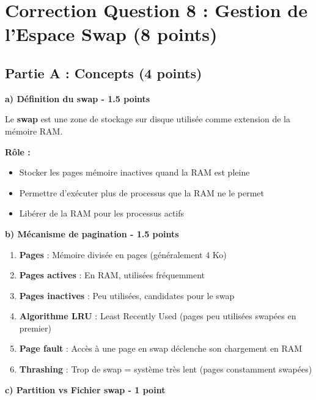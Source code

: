 \documentclass[12pt,a4paper]{article}
\begin{document}
\newpage


\section{Correction Question 8 : Gestion de l'Espace Swap (8 points)}

\subsection*{Partie A : Concepts (4 points)}

\begin{answerbox}
\textbf{a) Définition du swap - 1.5 points}

Le \textbf{swap} est une zone de stockage sur disque utilisée comme extension de la mémoire RAM.

\textbf{Rôle :}
\begin{itemize}
    \item Stocker les pages mémoire inactives quand la RAM est pleine
    \item Permettre d'exécuter plus de processus que la RAM ne le permet
    \item Libérer de la RAM pour les processus actifs
\end{itemize}

\textbf{b) Mécanisme de pagination - 1.5 points}

\begin{enumerate}
    \item \textbf{Pages} : Mémoire divisée en pages (généralement 4 Ko)
    \item \textbf{Pages actives} : En RAM, utilisées fréquemment
    \item \textbf{Pages inactives} : Peu utilisées, candidates pour le swap
    \item \textbf{Algorithme LRU} : Least Recently Used (pages peu utilisées swapées en premier)
    \item \textbf{Page fault} : Accès à une page en swap déclenche son chargement en RAM
    \item \textbf{Thrashing} : Trop de swap = système très lent (pages constamment swapées)
\end{enumerate}

\textbf{c) Partition vs Fichier swap - 1 point}


\end{answerbox}
\end{document}
